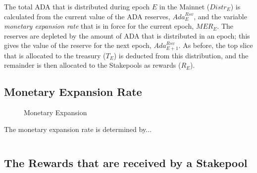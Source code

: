 \documentclass[11pt,a4paper,dvipsnames,twosided,final]{article}
\newcommand{\ada}{ADA{}}
\begin{document}
\noindent
The total \ada{} that is distributed during epoch $E$ in the Mainnet (${Distr}_E$) is calculated from the current
value of the \ada{} reserves, $\textit{Ada}^{Rsv}_E$, and the variable \emph{monetary expansion rate} that is in force for
the current epoch, $\textit{MER}_E$.
%
The reserves are depleted by the amount of \ada{} that is distributed in an epoch; this gives the
value of the reserve for the next epoch, $\textit{Ada}^{Rsv}_{E+1}$.  As before, the top slice that is allocated to the treasury ($T_E$) is
deducted from this distribution, and the remainder is then allocated to the Stakepools as rewards ($R_E$).

\subsection{Monetary Expansion Rate}

\begin{figure}[h!]
  \begin{center}
  \end{center}
  \caption{Monetary Expansion}
\end{figure}

The monetary expansion rate is determined by...

\begin{equation}
\end{equation}


\clearpage
\subsection{The Rewards that are received by a Stakepool}
\end{document}

